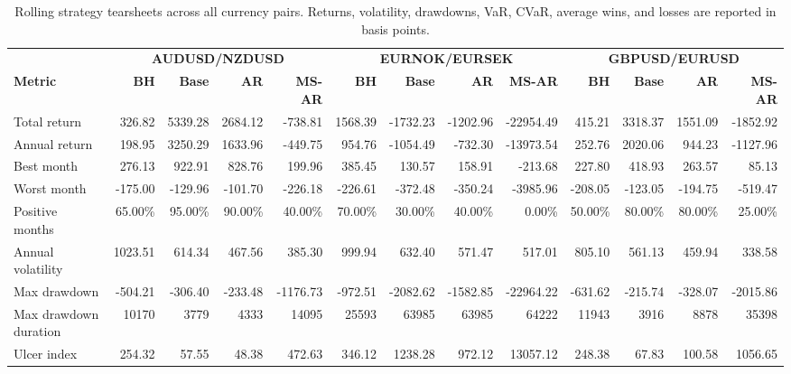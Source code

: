 \begin{table}[H]
\centering
\caption{Rolling strategy tearsheets across all currency pairs. Returns, volatility, drawdowns, VaR, CVaR, average wins, and losses are reported in basis points.}
\label{tab:rolling_strategy_tearsheets_all_pairs}
\small
\setlength{\tabcolsep}{2.0pt}
\renewcommand{\arraystretch}{2.5}

\begin{adjustbox}{max width=\linewidth, max totalheight=0.90\textheight}
\begin{tabular}{lrrrrrrrrrrrr}
\toprule
& \multicolumn{4}{c}{\textbf{AUDUSD/NZDUSD}}
& \multicolumn{4}{c}{\textbf{EURNOK/EURSEK}}
& \multicolumn{4}{c}{\textbf{GBPUSD/EURUSD}} \\
\cmidrule(lr){2-5}
\cmidrule(lr){6-9}
\cmidrule(lr){10-13}
\textbf{Metric}
& \textbf{BH} & \textbf{Base} & \textbf{AR} & \textbf{MS-AR}
& \textbf{BH} & \textbf{Base} & \textbf{AR} & \textbf{MS-AR}
& \textbf{BH} & \textbf{Base} & \textbf{AR} & \textbf{MS-AR} \\
\midrule
Total return              & 326.82 & 5339.28 & 2684.12 & -738.81 & 1568.39 & -1732.23 & -1202.96 & -22954.49 & 415.21 & 3318.37 & 1551.09 & -1852.92 \\
Annual return             & 198.95 & 3250.29 & 1633.96 & -449.75 & 954.76 & -1054.49 & -732.30 & -13973.54 & 252.76 & 2020.06 & 944.23 & -1127.96 \\
Best month                & 276.13 & 922.91 & 828.76 & 199.96 & 385.45 & 130.57 & 158.91 & -213.68 & 227.80 & 418.93 & 263.57 & 85.13 \\
Worst month               & -175.00 & -129.96 & -101.70 & -226.18 & -226.61 & -372.48 & -350.24 & -3985.96 & -208.05 & -123.05 & -194.75 & -519.47 \\
Positive months           & 65.00\% & 95.00\% & 90.00\% & 40.00\% & 70.00\% & 30.00\% & 40.00\% & 0.00\% & 50.00\% & 80.00\% & 80.00\% & 25.00\% \\
Annual volatility         & 1023.51 & 614.34 & 467.56 & 385.30 & 999.94 & 632.40 & 571.47 & 517.01 & 805.10 & 561.13 & 459.94 & 338.58 \\
Max drawdown              & -504.21 & -306.40 & -233.48 & -1176.73 & -972.51 & -2082.62 & -1582.85 & -22964.22 & -631.62 & -215.74 & -328.07 & -2015.86 \\
Max drawdown duration     & 10170 & 3779 & 4333 & 14095 & 25593 & 63985 & 63985 & 64222 & 11943 & 3916 & 8878 & 35398 \\
Ulcer index               & 254.32 & 57.55 & 48.38 & 472.63 & 346.12 & 1238.28 & 972.12 & 13057.12 & 248.38 & 67.83 & 100.58 & 1056.65 \\

\end{tabular}
\end{adjustbox}
\end{table}

